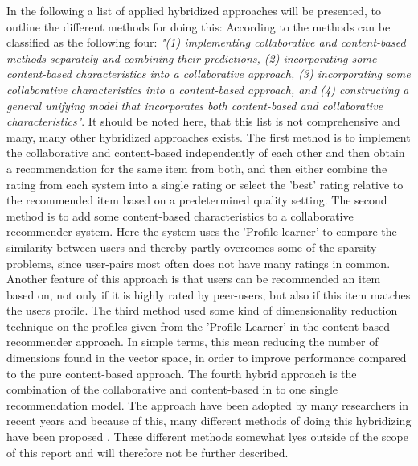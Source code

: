 In the following a list of applied hybridized approaches will be presented, to outline the different methods for doing this:
According to \citet[p. 20-22]{TowardsTheNextGenerationOfRs} the methods can be classified as the following four: \textit{"(1) implementing collaborative and content-based methods separately and combining their predictions, (2) incorporating some content-based characteristics into a collaborative approach, (3) incorporating some collaborative characteristics into a content-based approach, and (4) constructing a general unifying model that incorporates both content-based and collaborative characteristics"}. It should be noted here, that this list is not comprehensive and many, many other hybridized approaches exists. \newline
The first method is to implement the collaborative and content-based independently of each other and then obtain a recommendation for the same item from both, and then either combine the rating from each system into a single rating or select the 'best' rating relative to the recommended item based on a predetermined quality setting. \newline
The second method is to add some content-based characteristics to a collaborative recommender system. Here the system uses the 'Profile learner' to compare the similarity between users and thereby partly overcomes some of the sparsity problems, since user-pairs most often does not have many ratings in common. Another feature of this approach is that users can be recommended an item based on, not only if it is highly rated by peer-users, but also if this item matches the users profile. \newline
The third method used some kind of dimensionality reduction technique on the profiles given from the 'Profile Learner' in the content-based recommender approach. In simple terms, this mean reducing the number of dimensions found in the vector space, in order to improve performance compared to the pure content-based approach. \newline
The fourth hybrid approach is the combination of the collaborative and content-based in to one single recommendation model. The approach have been adopted by many researchers in recent years and because of this, many different methods of doing this hybridizing have been proposed \citep[p. 22]{TowardsTheNextGenerationOfRs}. These different methods somewhat lyes outside of the scope of this report and will therefore not be further described. \newline

